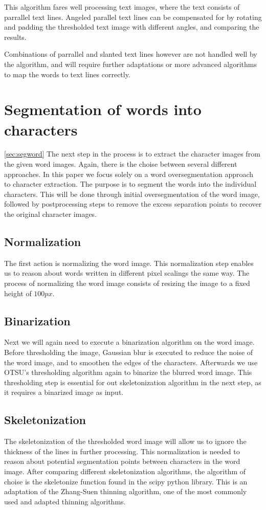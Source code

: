 \documentclass{article}
\begin{document}
This algorithm fares well processing text images, where the text consists of parrallel text lines.
Angeled parallel text lines can be compensated for by rotating and padding the thresholded text image with different angles, and comparing the results.

Combinations of parrallel and slanted text lines however are not handled well by the algorithm, and will require further adaptations or more advanced algorithms to map the words to text lines correctly.


\section{Segmentation of words into characters}
\ref{sec:segword}
The next step in the process is to extract the character images from the given word images.
Again, there is the choise between several different approaches.
In this paper we focus solely on a word oversegmentation approach to character extraction.
The purpose is to segment the words into the individual characters.
This will be done through initial oversegmentation of the word image, followed by postprocessing steps to remove the excess separation points to recover the original character images.

\subsection{Normalization} %
The first action is normalizing the word image.
This normalization step enables us to reason about words written in different pixel scalings the same way.
The process of normalizing the word image consists of resizing the image to a fixed height of $100px$.

\subsection{Binarization}
Next we will again need to execute a binarization algorithm on the word image.
Before thresholding the image, Gaussian blur is executed to reduce the noise of the word image, and to smoothen the edges of the characters.
Afterwards we use OTSU's thresholding algorithm again to binarize the blurred word image.
This thresholding step is essential for out skeletonization algorithm in the next step, as it requires a binarized image as input.

\subsection{Skeletonization}
The skeletonization of the thresholded word image will allow us to ignore the thickness of the lines in further processing. 
This normalization is needed to reason about potential segmentation points between characters in the word image.
After comparing different skeletonization algorithms, the algorithm of choise is the skeletonize function found in the scipy python library.
This is an adaptation of the Zhang-Suen thinning algorithm, one of the most commonly used and adapted thinning algorithms.
\end{document}
